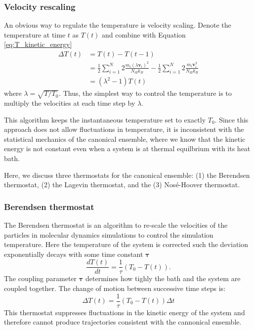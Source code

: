\subsubsection{Velocity rescaling}
An obvious way to regulate the temperature is velocity scaling\cite{tadmor2011_md}.  Denote the temperature at time $t$ as $T(t)$ and combine with Equation \ref{eq:T_kinetic_energy}
\begin{align}
  \Delta T(t)
  &= T(t) - T(t-1) \\
  &= \frac{1}{2}
     \sum_{i=1}^N 2 \frac{m_i (\lambda \bm{v}_i)^2}
                         {N_{\mathrm{df}} k_B}
     -
     \frac{1}{2}
     \sum_{i=1}^N 2 \frac{m_i \bm{v}_i^2}
                         {N_{\mathrm{df}} k_B} \\
  &= (\lambda^2 - 1) T(t)
\end{align}
where $\lambda = \sqrt{T/T_0}$.  Thus, the simplest way to control the temperature is to multiply the velocities at each time step by $\lambda$.

This algorithm keeps the instantaneous temperature set to exactly $T_0$.  Since this approach does not allow fluctuations in temperature, it is inconsistent with the statistical mechanics of the canonical ensemble, where we know that the kinetic energy is not constant even when a system is at thermal equilbrium with its heat bath.

Here, we discuss three thermostats for the canonical ensemble: (1) the Berendsen thermostat, (2) the Lagevin thermostat, and the (3) Nos\'e-Hoover thermostat.

\subsubsection{Berendsen thermostat}

The Berendsen thermostat\cite{berendsen1984_nvt} is an algorithm to re-scale the velocities of the particles in molecular dynamics simulations to control the simulation temperature.  Here the temperature of the system is corrected such the deviation exponentially decays with some time constant $\bm{\tau}$
\begin{equation}
  \label{eq:npt_berendsen_1}
  \frac{dT(t)}{dt} = \frac{1}{\tau} (T_0 - T(t)).
\end{equation}
The coupling parameter $\bm{\tau}$ determines how tighly the bath and the system are coupled together.  The change of motion between successive time steps is:
\begin{equation}
  \label{eq:npt_berendsen_2}
  \Delta T(t) = \frac{1}{\tau} (T_0 - T(t)) \Delta t
\end{equation}
This thermostat suppresses fluctuations in the kinetic energy of the system and therefore cannot produce trajectories consistent with the cannonical ensemble.

